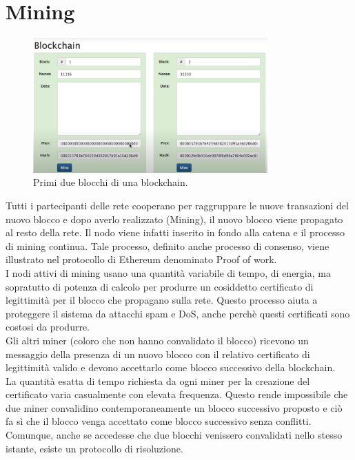 \documentclass[a4paper,11pt]{report}
\begin{document}
\section{Mining}
\begin{figure}[htbp] 
\begin{center}
\includegraphics[width=9cm]{img/mm.png} 
\end{center}
\caption{Primi due blocchi di una blockchain. \cite{mine}}
\end{figure} 
Tutti i partecipanti delle rete cooperano per raggruppare le nuove transazioni del nuovo blocco e dopo averlo realizzato (Mining), il nuovo blocco viene propagato al resto della rete. Il nodo viene infatti inserito in fondo alla catena e il processo di mining continua. Tale processo, definito anche processo di consenso, viene illustrato nel protocollo di Ethereum denominato Proof of work.\\
I nodi attivi di mining usano una quantità variabile di tempo, di energia, ma sopratutto di potenza di calcolo per produrre un cosiddetto certificato di legittimità per il blocco che propagano sulla rete. Questo processo aiuta a proteggere il sistema da attacchi spam e DoS, anche perchè questi certificati sono costosi da produrre.\\
Gli altri miner (coloro che non hanno convalidato il blocco) ricevono un messaggio della presenza di un nuovo blocco con il relativo certificato di legittimità valido e devono accettarlo come blocco successivo della blockchain.\\
La quantità esatta di tempo richiesta da ogni miner per la creazione del certificato varia casualmente con elevata frequenza. Questo rende impossibile che due miner convalidino contemporaneamente un blocco successivo proposto e ciò fa sì che il blocco venga accettato come blocco successivo senza conflitti. Comunque, anche se accedesse che due blocchi venissero convalidati nello stesso istante, esiste un protocollo di risoluzione.
\end{document}
